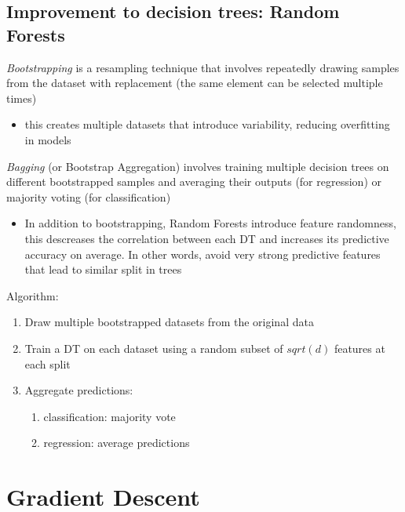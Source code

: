 \documentclass{article}
\begin{document}
\subsection{Improvement to decision trees: Random
Forests}\label{improvement-to-decision-trees-random-forests}

\emph{Bootstrapping} is a resampling technique that involves repeatedly
drawing samples from the dataset with replacement (the same element can
be selected multiple times)

\begin{itemize}
\tightlist
\item
  this creates multiple datasets that introduce variability, reducing
  overfitting in models
\end{itemize}

\emph{Bagging} (or Bootstrap Aggregation) involves training multiple
decision trees on different bootstrapped samples and averaging their
outputs (for regression) or majority voting (for classification)

\begin{itemize}
\tightlist
\item
  In addition to bootstrapping, Random Forests introduce feature
  randomness, this descreases the correlation between each DT and
  increases its predictive accuracy on average. In other words, avoid
  very strong predictive features that lead to similar split in trees
\end{itemize}

Algorithm:

\begin{enumerate}
\def\labelenumi{\arabic{enumi}.}
\tightlist
\item
  Draw multiple bootstrapped datasets from the original data
\item
  Train a DT on each dataset using a random subset of \(sqrt(d)\)
  features at each split
\item
  Aggregate predictions:

  \begin{enumerate}
  \def\labelenumii{\arabic{enumii}.}
  \tightlist
  \item
    classification: majority vote
  \item
    regression: average predictions
  \end{enumerate}
\end{enumerate}

\section{Gradient Descent}\label{gradient-descent}
\end{document}
